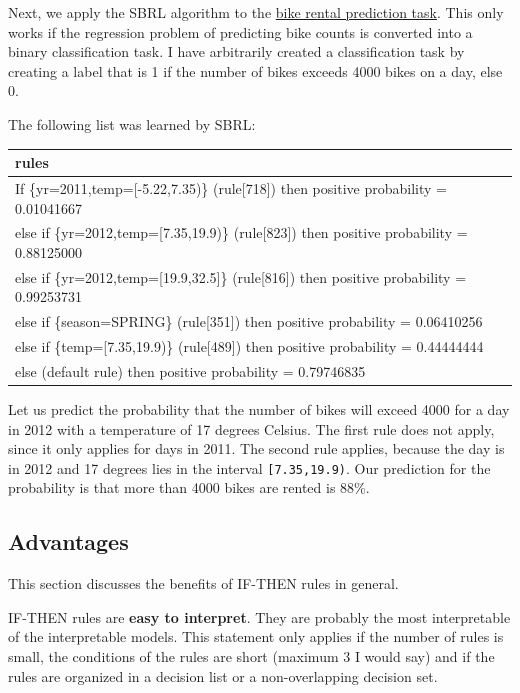 \documentclass[12pt,]{krantz}
\begin{document}
Next, we apply the SBRL algorithm to the
\protect\hyperlink{bike-data}{bike rental prediction task}. This only
works if the regression problem of predicting bike counts is converted
into a binary classification task. I have arbitrarily created a
classification task by creating a label that is 1 if the number of bikes
exceeds 4000 bikes on a day, else 0.

The following list was learned by SBRL:

\begin{tabular}{>{\raggedright\arraybackslash}p{10cm}}
\hline
rules\\
\hline
If      \{yr=2011,temp=[-5.22,7.35)\} (rule[718]) then positive probability = 0.01041667\\
\hline
else if \{yr=2012,temp=[7.35,19.9)\} (rule[823]) then positive probability = 0.88125000\\
\hline
else if \{yr=2012,temp=[19.9,32.5]\} (rule[816]) then positive probability = 0.99253731\\
\hline
else if \{season=SPRING\} (rule[351]) then positive probability = 0.06410256\\
\hline
else if \{temp=[7.35,19.9)\} (rule[489]) then positive probability = 0.44444444\\
\hline
else  (default rule)  then positive probability = 0.79746835\\
\hline
\end{tabular}

Let us predict the probability that the number of bikes will exceed 4000
for a day in 2012 with a temperature of 17 degrees Celsius. The first
rule does not apply, since it only applies for days in 2011. The second
rule applies, because the day is in 2012 and 17 degrees lies in the
interval \texttt{{[}7.35,19.9)}. Our prediction for the probability is
that more than 4000 bikes are rented is 88\%.

\subsection{Advantages}\label{advantages-3}

This section discusses the benefits of IF-THEN rules in general.

IF-THEN rules are \textbf{easy to interpret}. They are probably the most
interpretable of the interpretable models. This statement only applies
if the number of rules is small, the conditions of the rules are short
(maximum 3 I would say) and if the rules are organized in a decision
list or a non-overlapping decision set.
\end{document}
